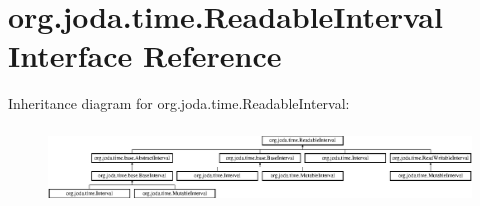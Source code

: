 \hypertarget{interfaceorg_1_1joda_1_1time_1_1_readable_interval}{\section{org.\-joda.\-time.\-Readable\-Interval Interface Reference}
\label{interfaceorg_1_1joda_1_1time_1_1_readable_interval}
}
Inheritance diagram for org.\-joda.\-time.\-Readable\-Interval\-:\begin{figure}[H]
\begin{center}
\leavevmode
\includegraphics[height=2.064516cm]{interfaceorg_1_1joda_1_1time_1_1_readable_interval}
\end{center}
\end{figure}
